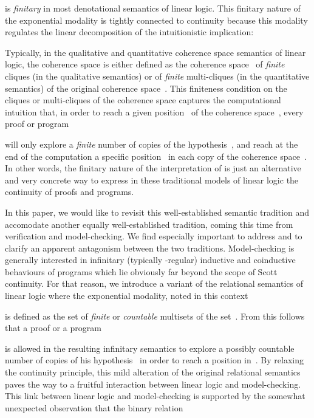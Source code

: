 \documentclass[runningheads,a4paper]{llncs}
\begin{document}
is \emph{finitary} in most denotational semantics of linear logic.
This finitary nature of the exponential modality is tightly connected to continuity
because this modality regulates the linear decomposition of the intuitionistic implication:

Typically, in the qualitative and quantitative 
coherence space semantics of linear logic, 
the coherence space  is either defined as the coherence space~ 
of \emph{finite} cliques (in the qualitative semantics) or of \emph{finite} multi-cliques (in the quantitative semantics)
of the original coherence space~.
This finiteness condition on the cliques  or multi-cliques  of the coherence space  
captures the computational intuition that, in order to reach a given position~ of the coherence space~,
every proof or program

will only explore a \emph{finite} number of copies of the hypothesis~, 
and reach at the end of the computation a specific position~ in each copy of the coherence space~.
In other words, the finitary nature of the interpretation of  is just an alternative
and very concrete way to express in these traditional models of linear logic
the continuity of proofs and programs.



In this paper, we would like to revisit this well-established semantic tradition and accomodate another equally well-established tradition,
coming this time from verification and model-checking.
We find especially important to address and to clarify an apparent antagonism between the two traditions.
Model-checking is generally interested in infinitary (typically -regular) inductive and coinductive behaviours 
of programs which lie obviously far beyond the scope of Scott continuity.
For that reason, we introduce a variant of the relational semantics of linear logic 
where the exponential modality, noted in this context

is defined as the set of \emph{finite} or \emph{countable} multisets of the set~.
From this follows that a proof or a program

is allowed in the resulting infinitary semantics to explore
a possibly countable number of copies of his hypothesis~ 
in order to reach a position in~.
By relaxing the continuity principle, this mild alteration of the original relational semantics
paves the way to a fruitful interaction between linear logic and model-checking.
This link between linear logic and model-checking is supported by the somewhat unexpected observation 
that the binary relation 
\end{document}
